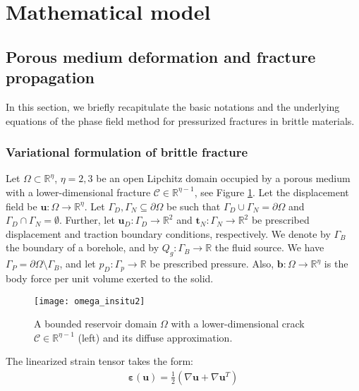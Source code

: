 \section{Mathematical model}\label{sec:Math_model}

\subsection{Porous medium deformation and fracture propagation}\label{Sec:Phase_Field}
In this section, 
we briefly recapitulate the basic notations and the underlying equations of the phase field method for pressurized fractures in brittle materials.

\subsubsection{Variational formulation of brittle fracture}
Let $\Omega\subset\mathbb{R}^\eta$, $\eta=2,3$ be an open Lipchitz domain occupied by a porous medium with a lower-dimensional fracture $\mathcal{C}\in\mathbb{R}^{\eta-1}$, see Figure \ref{Fig:comput_domain}. Let the displacement field be $\bm{u}:\Omega\rightarrow\mathbb{R}^\eta$. Let $\Gamma_D,\Gamma_N\subseteq \partial\Omega$ be such that $\Gamma_D\cup\Gamma_N=\partial\Omega$ and $\Gamma_D\cap\Gamma_N=\emptyset$. Further, let $\bm{u}_D: \Gamma_D\rightarrow\mathbb{R}^2$ and $\bm{t}_N: \Gamma_N\rightarrow\mathbb{R}^2$ be prescribed displacement and traction boundary conditions, respectively. We denote by $\Gamma_B$ the boundary of a borehole, and by $Q_g:\Gamma_B\rightarrow\mathbb{R}$ the fluid source. We have $\Gamma_P=\partial\Omega\setminus\Gamma_B$, and let $p_D:\Gamma_p\rightarrow\mathbb{R}$ be prescribed pressure. Also, $\mathbf{b}:\Omega\rightarrow\mathbb{R}^\eta$ is the body force per unit volume exerted to the solid.
\begin{figure}[htbp]
	\centering
	\texttt{[image: omega\_insitu2]}
	\caption{A bounded reservoir domain $\Omega$ with a lower-dimensional crack $\mathcal{C}\in\mathbb{R}^{\eta-1}$ (left) and its diffuse approximation.}
	\label{Fig:comput_domain}
\end{figure}
The linearized strain tensor takes the form:
\begin{equation}\label{Eq:epsilon}
	\begin{aligned}
		\bm{\varepsilon}(\bm{u})=\frac12(\nabla\bm{u}+\nabla\bm{u}^T)
	\end{aligned}
\end{equation}
